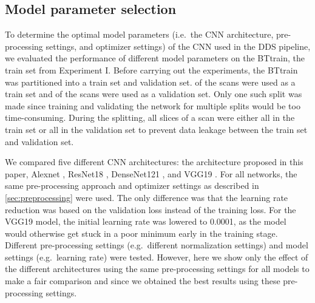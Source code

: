 \clearpage
\begin{subappendices}
\section{Model parameter selection}\label{app:crossval}

To determine the optimal model parameters (i.e.\ the \gls{CNN} architecture, pre-processing settings, and optimizer settings) of the \gls{CNN} used in the \gls{DDS} pipeline, we evaluated the performance of different model parameters on the \gls{BTtrain}, the train set from Experiment I.
Before carrying out the experiments, the \gls{BTtrain} was partitioned into a train set and validation set.
 of the \glspl{scan} were used as a train set and  of the \glspl{scan} were used as a validation set.
Only one such split was made since training and validating the network for multiple splits would be too time-consuming.
During the splitting, all \glspl{slice} of a \gls{scan} were either all in the train set or all in the validation set to prevent data leakage between the train set and validation set.

We compared five different \gls{CNN} architectures: the architecture proposed in this paper, Alexnet \autocite{krizhevsky2012imagenet}, ResNet18 \autocite{he2016deep}, DenseNet121 \autocite{huang2017densely}, and VGG19 \autocite{simonyan2014very}.
For all networks, the same pre-processing approach and optimizer settings as described in \cref{sec:preprocessing} were used.
The only difference was that the learning rate reduction was based on the validation loss instead of the training loss.
For the VGG19 model, the initial learning rate was lowered to \num{0.0001}, as the model would otherwise get stuck in a poor minimum early in the training stage.
Different pre-processing settings (e.g.\ different normalization settings) and model settings (e.g.\ learning rate) were tested.
However, here we show only the effect of the different architectures using the same pre-processing settings for all models to make a fair comparison and since we obtained the best results using these pre-processing settings.


\end{subappendices}
